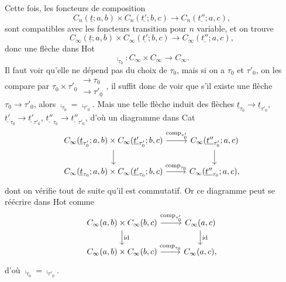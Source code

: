 
Cette fois, les foncteurs de composition
\[ C_n(\underline{t};a,b)\times C_n(\underline{t'};b,c) \longrightarrow C_n(\underline{t''};a,c), \]
sont compatibles avec les foncteurs transition pour $n$ variable, et on trouve
\[ C_\infty(\underline{t};a,b)\times C_\infty(\underline{t'};b,c) \longrightarrow C_\infty(\underline{t''};a,c), \]
donc une flèche dans Hot
\[ \comp_{\tau_0} : C_\infty\times C_\infty \longrightarrow C_\infty. \]
Il faut voir qu'elle ne dépend pas du choix de $\tau_0$, mais si on a $\tau_0$ et $\tau'_0$, on les compare par $\tau_0\times\tau'_0 \begin{array}{l}\longrightarrow \tau_0\\ \longrightarrow \tau'_0\end{array}$, il suffit donc de voir que s'il existe une flèche $\tau_0\longrightarrow\tau'_0$, alors $\comp_{\tau_0} = \comp_{\tau'_0}$. Mais une telle flèche induit des flèches $\underline{t}_{\tau_0}\longrightarrow\underline{t}_{\tau'_0}$, $\underline{t'}_{\tau_0}\longrightarrow\underline{t'}_{\tau'_0}$, $\underline{t''}_{\tau_0}\longrightarrow\underline{t''}_{\tau'_0}$, d'où un diagramme dans Cat
\[
\begin{tikzcd}
C_\infty(\underline{t}_{\tau'_0};a,b)\times C_\infty(\underline{t'}_{\tau'_0};b,c) \arrow[r, "{\comp_{\tau'_0}}"] \arrow[d] & C_\infty(\underline{t''}_{\tau'_0};a,c) \arrow[d] \\
C_\infty(\underline{t}_{\tau_0};a,b)\times C_\infty(\underline{t'}_{\tau_0};b,c) \arrow[r, "{\comp_{\tau_0}}"] & C_\infty(\underline{t''}_{\tau_0};a,c),
\end{tikzcd}
\]
dont on vérifie tout de suite qu'il est commutatif. Or ce diagramme peut se réécrire dans Hot comme
\[
\begin{tikzcd}
C_\infty(a,b)\times C_\infty(b,c) \arrow[r, "{\comp_{\tau'_0}}"] \arrow[d, "{\mathrm{id}}"] & C_\infty(a,c) \arrow[d, "{\mathrm{id}}"] \\
C_\infty(a,b)\times C_\infty(b,c) \arrow[r, "{\comp_{\tau_0}}"] & C_\infty(a,c),
\end{tikzcd}
\]
d'où $\comp_{\tau_0} = \comp_{\tau'_0}$.

